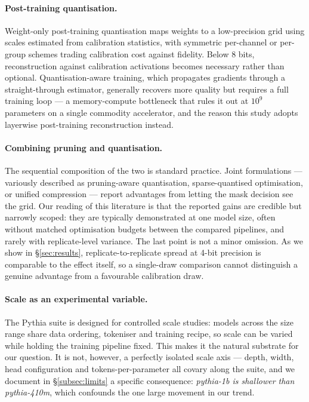 \paragraph{Post-training quantisation.} Weight-only post-training quantisation maps weights
to a low-precision grid using scales estimated from calibration statistics, with symmetric
per-channel or per-group schemes trading calibration cost against fidelity. Below 8 bits,
reconstruction against calibration activations becomes necessary rather than optional.
Quantisation-aware training, which propagates gradients through a straight-through estimator,
generally recovers more quality but requires a full training loop --- a memory-compute
bottleneck that rules it out at $10^{9}$ parameters on a single commodity accelerator, and
the reason this study adopts layerwise post-training reconstruction instead.

\paragraph{Combining pruning and quantisation.} The sequential composition of the two is
standard practice. Joint formulations --- variously described as pruning-aware quantisation,
sparse-quantised optimisation, or unified compression --- report advantages from letting the
mask decision see the grid. Our reading of this literature is that the reported gains are
credible but narrowly scoped: they are typically demonstrated at one model size, often
without matched optimisation budgets between the compared pipelines, and rarely with
replicate-level variance. The last point is not a minor omission. As we show in
\S\ref{sec:results}, replicate-to-replicate spread at 4-bit precision is comparable to the
effect itself, so a single-draw comparison cannot distinguish a genuine advantage from a
favourable calibration draw.

\paragraph{Scale as an experimental variable.} The Pythia suite is designed for controlled
scale studies: models across the size range share data ordering, tokeniser and training
recipe, so scale can be varied while holding the training pipeline fixed. This makes it the
natural substrate for our question. It is not, however, a perfectly isolated scale axis ---
depth, width, head configuration and tokens-per-parameter all covary along the suite, and we
document in \S\ref{subsec:limits} a specific consequence: \emph{pythia-1b is shallower than
pythia-410m}, which confounds the one large movement in our trend.

